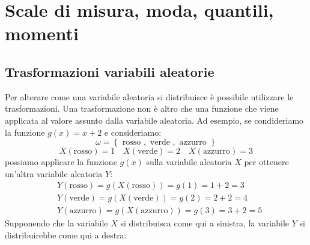 \section{Scale di misura, moda, quantili, momenti}
\subsection{Trasformazioni variabili aleatorie}
Per alterare come una variabile aleatoria si distribuisce è possibile utilizzare le trasformazioni. Una trasformazione non è altro che una funzione che viene applicata al valore assunto dalla variabile aleatoria. Ad esempio, se condideriamo la funzione $ g\left(x\right) = x + 2 $ e consideriamo:
\[
	\omega = \left\{\text{ rosso }, \text{ verde }, \text{ azzurro }\right\}
\]
\[
	X\left(\text{rosso}\right)=1  \quad X \left(\text{verde}\right) = 2 \quad X \left(\text{azzurro}\right) = 3
\]
possiamo applicare la funzione $ g\left(x\right) $ sulla variabile aleatoria $ X $ per ottenere un'altra variabile aleatoria $ Y $:
\begin{align*}
	 & Y\left(\text{rosso}\right)=g\left(X\left(\text{rosso}\right)\right) = g\left(1\right) = 1 + 2 = 3     \\
	 & Y\left(\text{verde}\right)=g\left(X\left(\text{verde}\right)\right) = g\left(2\right) = 2 + 2 = 4     \\
	 & Y\left(\text{azzurro}\right)=g\left(X\left(\text{azzurro}\right)\right) = g\left(3\right) = 3 + 2 = 5
\end{align*}
Supponendo che la variabile $ X $ si distribuisca come qui a sinistra, la variabile $ Y $ si distribuirebbe come qui a destra:
\vskip3mm


